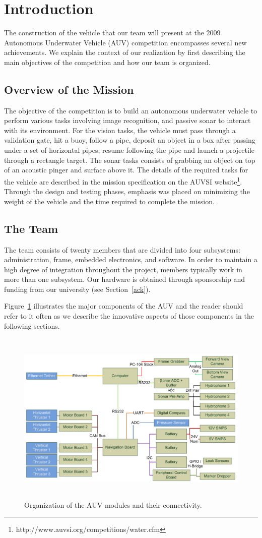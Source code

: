 \section{Introduction} 

The construction of the vehicle that our team will present at the
2009 Autonomous Underwater Vehicle (AUV) competition encompasses several new achievements. We explain the
context of our realization by first describing the main
objectives of the competition and how our team is organized.


\subsection{Overview of the Mission}

The objective of the competition is to build an autonomous underwater
vehicle to perform various tasks involving image recognition, and
passive sonar to
interact with its environment. For the vision tasks, the vehicle must 
pass through a validation gate, hit a buoy, follow a pipe, deposit an object
 in a box after passing under a set of horizontal pipes, resume following
 the pipe and launch a projectile through a rectangle target. The sonar tasks consists of
grabbing an object on top of an acoustic pinger and surface above it.
The details of the required tasks for the vehicle are described in the
 mission specification on the AUVSI website\footnote[1]{http://www.auvsi.org/competitions/water.cfm}.
 Through the design and testing phases, emphasis was placed on minimizing the weight 
 of the vehicle and the time required to complete the mission.

\subsection{The Team}
The team consists of twenty members that are divided into four subsystems: administration, frame, embedded electronics, and software. In order to maintain a high degree of integration throughout the project, members typically work in more than one subsystem. Our hardware is obtained through sponsorship and funding from our university (see Section~\ref{ack}). 

Figure~\ref{organi} illustrates the major components of the AUV
and the reader should refer to it often as we describe the innovative
aspects of those components in the following sections.


\begin{figure}
\begin{center}
 \includegraphics[height=3.3in]{fig/visio.pdf}
\caption{Organization of the AUV modules and their connectivity.}\label{organi}
\end{center}
\end{figure}


